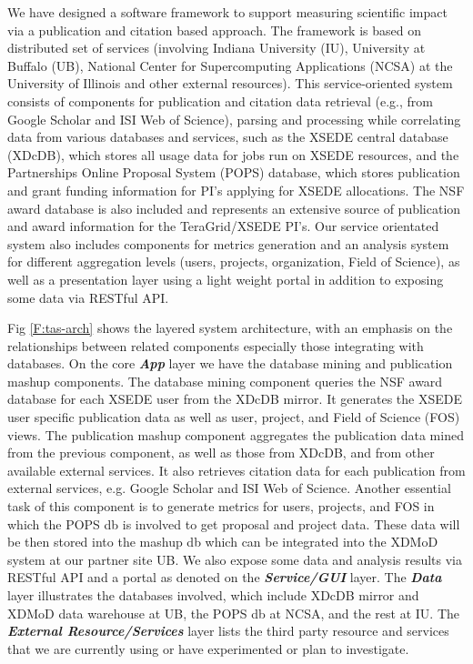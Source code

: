 \documentclass{tex/sig-alternate}
\begin{document}
We have designed a software framework to support measuring scientific impact via a publication and citation based approach. The framework is based on distributed set of services (involving Indiana University (IU), University at Buffalo (UB), National Center for Supercomputing Applications (NCSA) at the University of Illinois and other external resources). This service-oriented system consists of components for publication and citation data retrieval (e.g., from Google Scholar and ISI Web of Science), parsing and processing while correlating data from various databases and services, such as the XSEDE central database (XDcDB), which stores all usage data for jobs run on XSEDE resources, and the Partnerships Online Proposal System (POPS) database, which stores publication and grant funding information for PI's applying for XSEDE allocations. The NSF award database is also included and represents an extensive source of publication and award information for the TeraGrid/XSEDE PI's. Our service orientated system also includes components for metrics generation and an analysis system for different aggregation levels (users, projects, organization, Field of Science), as well as a presentation layer using a light weight portal in addition to exposing some data via RESTful API.

Fig \ref{F:tas-arch} shows the layered system architecture, with an emphasis on the relationships between related components especially those integrating with databases. On the core \emph{\textbf{App}} layer we have the database mining and publication mashup components. The database mining component queries the NSF award database for each XSEDE user from the XDcDB mirror. It generates the XSEDE user specific publication data as well as user, project, and Field of Science (FOS) views. The publication mashup component aggregates the publication data mined from the previous component, as well as those from XDcDB, and from other available external services. It also retrieves citation data for each publication from external services, e.g. Google Scholar and ISI Web of Science. Another essential task of this component is to generate metrics for users, projects, and FOS in which the POPS db is involved to get proposal and project data. These data will be then stored into the mashup db which can be integrated into the XDMoD \cite{CPE:CPE2871,Browne:2013:ECD:2503210.2503230,browne2014comprehensive,Furlani:2013:UXF:2484762.2484763,Lu:2013:CJL:2484762.2484781} system at our partner site UB. We also expose some data and analysis results via RESTful API and a portal as denoted on the \emph{\textbf{Service/GUI}} layer. The \emph{\textbf{Data}} layer illustrates the databases involved, which include XDcDB mirror and XDMoD data warehouse at UB, the POPS db at NCSA, and the rest at IU. The \emph{\textbf{External Resource/Services}} layer lists the third party resource and services that we are currently using or have experimented or plan to investigate.
\end{document}
